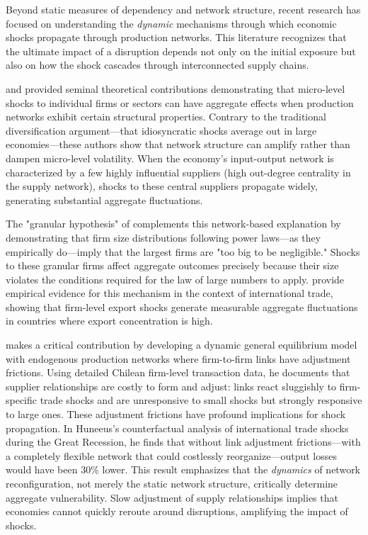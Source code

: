 \documentclass[final,1p,times,authoryear]{elsarticle}
\begin{document}
Beyond static measures of dependency and network structure, recent research has focused on understanding the \textit{dynamic} mechanisms through which economic shocks propagate through production networks. This literature recognizes that the ultimate impact of a disruption depends not only on the initial exposure but also on how the shock cascades through interconnected supply chains.

\cite{Acemoglu2012} and \cite{Carvalho2013} provided seminal theoretical contributions demonstrating that micro-level shocks to individual firms or sectors can have aggregate effects when production networks exhibit certain structural properties. Contrary to the traditional diversification argument—that idiosyncratic shocks average out in large economies—these authors show that network structure can amplify rather than dampen micro-level volatility. When the economy's input-output network is characterized by a few highly influential suppliers (high out-degree centrality in the supply network), shocks to these central suppliers propagate widely, generating substantial aggregate fluctuations.

The "granular hypothesis" of \cite{Gabaix2011} complements this network-based explanation by demonstrating that firm size distributions following power laws—as they empirically do—imply that the largest firms are "too big to be negligible." Shocks to these granular firms affect aggregate outcomes precisely because their size violates the conditions required for the law of large numbers to apply. \cite{diGiovanni2012} provide empirical evidence for this mechanism in the context of international trade, showing that firm-level export shocks generate measurable aggregate fluctuations in countries where export concentration is high.

\cite{Huneeus2018} makes a critical contribution by developing a dynamic general equilibrium model with endogenous production networks where firm-to-firm links have adjustment frictions. Using detailed Chilean firm-level transaction data, he documents that supplier relationships are costly to form and adjust: links react sluggishly to firm-specific trade shocks and are unresponsive to small shocks but strongly responsive to large ones. These adjustment frictions have profound implications for shock propagation. In Huneeus's counterfactual analysis of international trade shocks during the Great Recession, he finds that without link adjustment frictions—with a completely flexible network that could costlessly reorganize—output losses would have been 30\% lower. This result emphasizes that the \textit{dynamics} of network reconfiguration, not merely the static network structure, critically determine aggregate vulnerability. Slow adjustment of supply relationships implies that economies cannot quickly reroute around disruptions, amplifying the impact of shocks.
\end{document}
